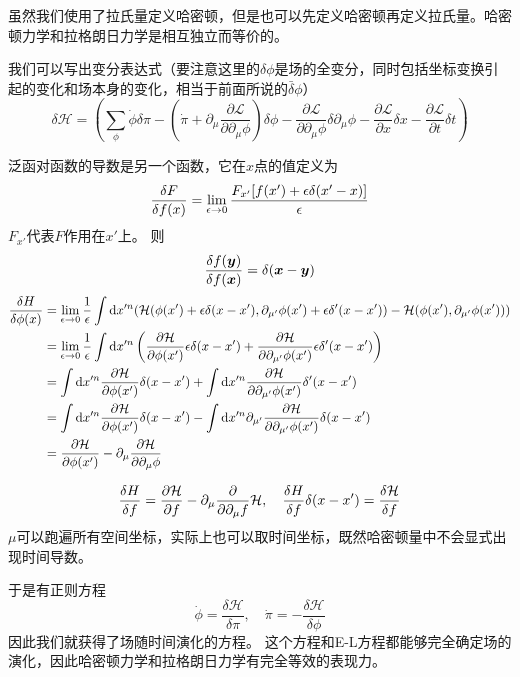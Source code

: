\documentclass[UTF8, a4paper]{ctexart}
\begin{document}
虽然我们使用了拉氏量定义哈密顿，但是也可以先定义哈密顿再定义拉氏量。哈密顿力学和拉格朗日力学是相互独立而等价的。

我们可以写出变分表达式（要注意这里的$\delta \phi$是场的全变分，同时包括坐标变换引起的变化和场本身的变化，相当于前面所说的$\bar{\delta} \phi$）
\[
    \delta \mathcal{H} = \left(\sum_\phi \dot{\phi} \delta \pi  - (\dot{\pi} + \partial_\mu \frac{\partial \mathcal{L}}{\partial \partial_\mu \phi}) \delta \phi - \frac{\partial \mathcal{L}}{\partial \partial_\mu \phi} \delta \partial_\mu \phi - \frac{\partial \mathcal{L}}{\partial x} \delta x - \frac{\partial \mathcal{L}}{\partial t} \delta t \right)
\]

泛函对函数的导数是另一个函数，它在$x$点的值定义为
\[
    \fdv{F}{f(x)} = \lim_{\epsilon \to 0} \frac{F_{x'}[f(x')+\epsilon \delta(x'-x)]}{\epsilon}
\]
$F_{x'}$代表$F$作用在$x'$上。
则
\[
    \fdv{f(\vb*{y})}{f(\vb*{x})} = \delta (\vb*{x} - \vb*{y})
\]
\[
    \begin{aligned}
        \fdv{H}{\phi(x)} &= \lim_{\epsilon\to 0} \frac{1}{\epsilon} \int \dd x'^n (
            \mathcal{H}(\phi(x') + \epsilon \delta (x - x'), \partial_{\mu'} \phi (x') + \epsilon \delta'(x - x')) - \mathcal{H}(\phi(x'), \partial_{\mu'}\phi(x'))) \\
        &= \lim_{\epsilon\to 0} \frac{1}{\epsilon} \int \dd x'^n \left(
            \pdv{\mathcal{H}}{\phi(x')} \epsilon \delta (x - x') + \pdv{\mathcal{H}}{\partial_{\mu'} \phi(x')} \epsilon \delta'(x - x') 
            \right)
        \\
        &= \int \dd x'^n
        \pdv{\mathcal{H}}{\phi(x')} \delta (x - x') + \int \dd x'^n \pdv{\mathcal{H}}{\partial_{\mu'} \phi(x')} \delta'(x - x') \\
        &= \int \dd x'^n
        \pdv{\mathcal{H}}{\phi(x')} \delta (x - x') - \int \dd x'^n \partial_{\mu'}\pdv{\mathcal{H}}{\partial_{\mu'} \phi(x')} \delta(x - x') \\
        &= \pdv{\mathcal{H}}{\phi(x')} - \partial_\mu \pdv{\mathcal{H}}{\partial_\mu \phi}
    \end{aligned}
\]

\[
    \fdv{H}{f} = \pdv{\mathcal{H}}{f} - \partial_\mu \pdv{\partial_\mu f} \mathcal{H}, \quad \fdv{H}{f} \delta(x - x') = \fdv{\mathcal{H}}{f}
\]
$\mu$可以跑遍所有空间坐标，实际上也可以取时间坐标，既然哈密顿量中不会显式出现时间导数。

于是有正则方程
\begin{equation}
    \dot{\phi} = \frac{\delta \mathcal{H}}{\delta \pi}, \quad \dot{\pi} = - \frac{\delta \mathcal{H}}{\delta \phi}
    \label{eq:canonical-equation}
\end{equation}
因此我们就获得了场随时间演化的方程。
这个方程和E-L方程都能够完全确定场的演化，因此哈密顿力学和拉格朗日力学有完全等效的表现力。
\end{document}

